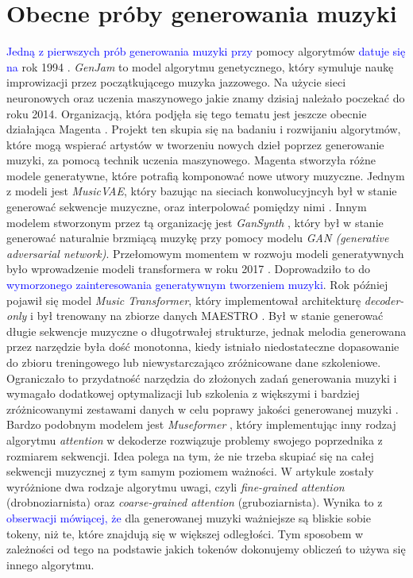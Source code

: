 \documentclass[data-science]{agh-wi} %
\begin{document}
\section{Obecne próby generowania muzyki}
\textcolor{blue}{Jedną z pierwszych prób generowania muzyki przy} pomocy algorytmów \textcolor{blue}{datuje się na} rok 1994 \cite{GenJam}. \textit{GenJam} to model algorytmu genetycznego, który symuluje naukę improwizacji przez początkującego muzyka jazzowego. Na użycie sieci neuronowych oraz uczenia maszynowego jakie znamy dzisiaj należało poczekać do roku 2014. Organizacją, która podjęła się tego tematu jest jeszcze obecnie działająca Magenta \cite*{magenta}. Projekt ten skupia się na badaniu i rozwijaniu algorytmów, które mogą wspierać artystów w tworzeniu nowych dzieł poprzez generowanie muzyki, za pomocą technik uczenia maszynowego. Magenta stworzyła różne modele generatywne, które potrafią komponować nowe utwory muzyczne. Jednym z modeli jest \textit{MusicVAE}, który bazując na sieciach konwolucyjncyh był w stanie generować sekwencje muzyczne, oraz interpolować pomiędzy nimi \cite*{musicvae}. Innym modelem stworzonym przez tą organizację jest \textit{GanSynth} \cite*{engel2018gansynth}, który był w stanie generować naturalnie brzmiącą muzykę przy pomocy modelu \textit{GAN (generative adversarial network)}. Przełomowym momentem w rozwoju modeli generatywnych było wprowadzenie modeli transformera w roku 2017 \cite*{attention}. Doprowadziło to do \textcolor{blue}{wymorzonego zainteresowania generatywnym tworzeniem muzyki}. Rok później pojawił się model \textit{Music Transformer}, który implementował architekturę \textit{decoder-only} i był trenowany na zbiorze danych MAESTRO \cite*{huang2018music}. Był w stanie generować długie sekwencje muzyczne o długotrwałej strukturze, jednak melodia generowana przez narzędzie była dość monotonna, kiedy istniało niedostateczne dopasowanie do zbioru treningowego lub niewystarczająco zróżnicowane dane szkoleniowe. Ograniczało to przydatność narzędzia do złożonych zadań generowania muzyki i wymagało dodatkowej optymalizacji lub szkolenia z większymi i bardziej zróżnicowanymi zestawami danych w celu poprawy jakości generowanej muzyki \cite*{zhu2023survey}. Bardzo podobnym modelem jest \textit{Museformer} \cite*{yu2022museformer}, który implementując inny rodzaj algorytmu \textit{attention} w dekoderze rozwiązuje problemy swojego poprzednika z rozmiarem sekwencji. Idea polega na tym, że nie trzeba skupiać się na całej sekwencji muzycznej z tym samym poziomem ważności. W artykule zostały wyróżnione dwa rodzaje algorytmu uwagi, czyli \textit{fine-grained attention} (drobnoziarnista) oraz \textit{coarse-grained attention} (gruboziarnista). Wynika to z \textcolor{blue}{obserwacji mówiącej, że} dla generowanej muzyki ważniejsze są bliskie sobie tokeny, niż te, które znajdują się w większej odległości. Tym sposobem w zależności od tego na podstawie jakich tokenów dokonujemy obliczeń to używa się innego algorytmu.
\end{document}
